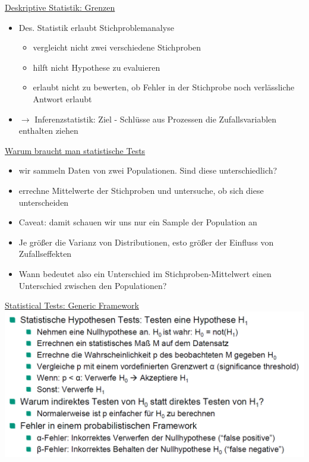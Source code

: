 \documentclass[a4paper,10pt,oneside]{article}
\begin{document}
\underline{Deskriptive Statistik: Grenzen} \\
	\begin{itemize}
		\item Des. Statistik erlaubt Stichproblemanalyse
			\begin{itemize}
				\item vergleicht nicht zwei verschiedene Stichproben
				\item hilft nicht Hypothese zu evaluieren
				\item erlaubt nicht zu bewerten, ob Fehler in der Stichprobe noch verlässliche Antwort erlaubt
			\end{itemize}
		\item $\rightarrow$ Inferenzstatistik: Ziel - Schlüsse aus Prozessen die Zufallsvariablen enthalten ziehen
	\end{itemize}
 	
\underline{Warum braucht man statistische Tests} \\
	\begin{itemize}
		\item wir sammeln Daten von zwei Populationen. Sind diese unterschiedlich?
		\item errechne Mittelwerte der Stichproben und untersuche, ob sich diese unterscheiden
		\item Caveat: damit schauen wir uns nur ein Sample der Population an
		\item Je größer die Varianz von Distributionen, esto größer der Einfluss von Zufallseffekten
		\item Wann bedeutet also ein Unterschied im Stichproben-Mittelwert einen Unterschied zwischen den Populationen?
	\end{itemize}
 		
\underline{Statistical Tests: Generic Framework} \\
\includegraphics[scale=0.2]{Grafiken/2427.png}
 
\end{document}
